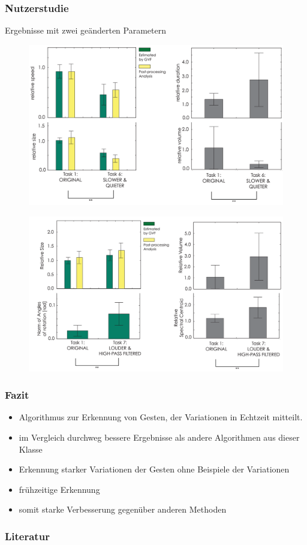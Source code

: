 \documentclass{beamer}
\begin{document}
\begin{frame}\frametitle{Nutzerstudie}
Ergebnisse mit zwei geänderten Parametern
\begin{figure}
\centering
\includegraphics[width=0.5\linewidth]{../Bilder/Fig17}
\label{fig:Fig17}
\end{figure}
\begin{figure}
\centering
\includegraphics[width=0.5\linewidth]{../Bilder/Fig18}
\label{fig:Fig18}
\end{figure}

\end{frame}

\begin{frame}\frametitle{Fazit}
\begin{itemize}
\item Algorithmus zur Erkennung von Gesten, der Variationen in Echtzeit mitteilt.
\item im Vergleich durchweg bessere Ergebnisse als andere Algorithmen aus dieser Klasse
\item Erkennung starker Variationen der Gesten ohne Beispiele der Variationen
\item frühzeitige Erkennung
\item somit starke Verbesserung gegenüber anderen Methoden
\end{itemize}
\end{frame}

\begin{frame}\frametitle{Literatur}



\end{frame}
\end{document}
